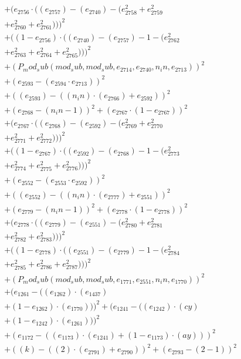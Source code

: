 \documentclass[10pt, a4paper]{article}
\begin{document}
\begin{align*}
& + (e_{2756}  \cdot  ((e_{2757}) - (e_{2740}) - (e_{2758}^{2} + e_{2759}^{2} \\
& + e_{2760}^{2} + e_{2761}^{2})))^{2} \\
& + ((1 - e_{2756})  \cdot  ((e_{2740}) - (e_{2757}) - 1 - (e_{2762}^{2} \\
& + e_{2763}^{2} + e_{2764}^{2} + e_{2765}^{2})))^{2} \\
& + (P_mod_sub(mod_sub, mod_sub, e_{2714}, e_{2740}, n_in, e_{2713}))^{2} \\
& + (e_{2593} - (e_{2594}  \cdot  e_{2713}))^{2} \\
& + ((e_{2593}) - ((n_in)  \cdot  (e_{2766}) + e_{2592}))^{2} \\
& + (e_{2768} - (n_in - 1))^{2} + (e_{2767}  \cdot  (1 - e_{2767}))^{2} \\
& + (e_{2767}  \cdot  ((e_{2768}) - (e_{2592}) - (e_{2769}^{2} + e_{2770}^{2} \\
& + e_{2771}^{2} + e_{2772}^{2})))^{2} \\
& + ((1 - e_{2767})  \cdot  ((e_{2592}) - (e_{2768}) - 1 - (e_{2773}^{2} \\
& + e_{2774}^{2} + e_{2775}^{2} + e_{2776}^{2})))^{2} \\
& + (e_{2552} - (e_{2553}  \cdot  e_{2592}))^{2} \\
& + ((e_{2552}) - ((n_in)  \cdot  (e_{2777}) + e_{2551}))^{2} \\
& + (e_{2779} - (n_in - 1))^{2} + (e_{2778}  \cdot  (1 - e_{2778}))^{2} \\
& + (e_{2778}  \cdot  ((e_{2779}) - (e_{2551}) - (e_{2780}^{2} + e_{2781}^{2} \\
& + e_{2782}^{2} + e_{2783}^{2})))^{2} \\
& + ((1 - e_{2778})  \cdot  ((e_{2551}) - (e_{2779}) - 1 - (e_{2784}^{2} \\
& + e_{2785}^{2} + e_{2786}^{2} + e_{2787}^{2})))^{2} \\
& + (P_mod_sub(mod_sub, mod_sub, e_{1771}, e_{2551}, n_in, e_{1770}))^{2} \\
& + (e_{1261} - ((e_{1262})  \cdot  (e_{1437}) \\
& + (1 - e_{1262})  \cdot  (e_{1770})))^{2} + (e_{1241} - ((e_{1242})  \cdot  (cy) \\
& + (1 - e_{1242})  \cdot  (e_{1261})))^{2} \\
& + (e_{1172} - ((e_{1173})  \cdot  (e_{1241}) + (1 - e_{1173})  \cdot  (ay)))^{2} \\
& + ((k) - ((2)  \cdot  (e_{2791}) + e_{2790}))^{2} + (e_{2793} - (2 - 1))^{2} \\

\end{align*}
\end{document}
